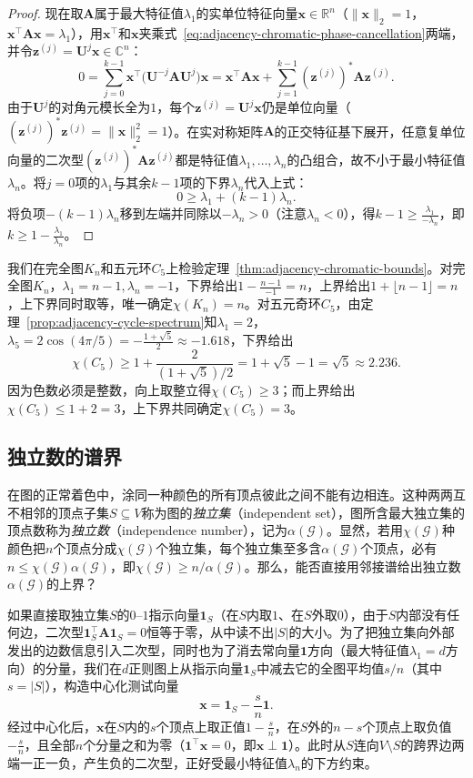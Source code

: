 \begin{proof}
现在取$\bm A$属于最大特征值$\lambda_1$的实单位特征向量$\bm x\in\mathbb R^n$（$\|\bm x\|_2=1$，$\bm x^\top\bm A\bm x=\lambda_1$），用$\bm x^\top$和$\bm x$夹乘式~\eqref{eq:adjacency-chromatic-phase-cancellation}两端，并令$\bm z^{(j)}=\bm U^j\bm x\in\mathbb C^n$：
\[
0=\sum_{j=0}^{k-1}\bm x^\top\bigl(\bm U^{-j}\bm A\bm U^j\bigr)\bm x
=\bm x^\top\bm A\bm x+\sum_{j=1}^{k-1}(\bm z^{(j)})^*\bm A\bm z^{(j)}.
\]
由于$\bm U^j$的对角元模长全为$1$，每个$\bm z^{(j)}=\bm U^j\bm x$仍是单位向量（$(\bm z^{(j)})^*\bm z^{(j)}=\|\bm x\|_2^2=1$）。在实对称矩阵$\bm A$的正交特征基下展开，任意复单位向量的二次型$(\bm z^{(j)})^*\bm A\bm z^{(j)}$都是特征值$\lambda_1,\ldots,\lambda_n$的凸组合，故不小于最小特征值$\lambda_n$。将$j=0$项的$\lambda_1$与其余$k-1$项的下界$\lambda_n$代入上式：
\[
0\geq\lambda_1+(k-1)\lambda_n.
\]
将负项$-(k-1)\lambda_n$移到左端并同除以$-\lambda_n>0$（注意$\lambda_n<0$），得$k-1\geq\frac{\lambda_1}{-\lambda_n}$，即$k\geq 1-\frac{\lambda_1}{\lambda_n}$。
\end{proof}

我们在完全图$K_n$和五元环$C_5$上检验定理~\ref{thm:adjacency-chromatic-bounds}。对完全图$K_n$，$\lambda_1=n-1,\lambda_n=-1$，下界给出$1-\frac{n-1}{-1}=n$，上界给出$1+\lfloor n-1\rfloor=n$，上下界同时取等，唯一确定$\chi(K_n)=n$。对五元奇环$C_5$，由定理~\ref{prop:adjacency-cycle-spectrum}知$\lambda_1=2$，$\lambda_5=2\cos(4\pi/5)=-\frac{1+\sqrt 5}{2}\approx -1.618$，下界给出
\[
\chi(C_5)\geq 1+\frac{2}{(1+\sqrt 5)/2}=1+\sqrt 5-1=\sqrt 5\approx 2.236.
\]
因为色数必须是整数，向上取整立得$\chi(C_5)\geq 3$；而上界给出$\chi(C_5)\leq 1+2=3$，上下界共同确定$\chi(C_5)=3$。

\subsection{独立数的谱界}
\label{sec:adjacency-hoffman-independence}

在图的正常着色中，涂同一种颜色的所有顶点彼此之间不能有边相连。这种两两互不相邻的顶点子集$S\subseteq V$称为图的\emph{独立集}（independent set），图所含最大独立集的顶点数称为\emph{独立数}（independence number），记为$\alpha(\mathcal G)$。显然，若用$\chi(\mathcal G)$种颜色把$n$个顶点分成$\chi(\mathcal G)$个独立集，每个独立集至多含$\alpha(\mathcal G)$个顶点，必有$n\leq\chi(\mathcal G)\alpha(\mathcal G)$，即$\chi(\mathcal G)\geq n/\alpha(\mathcal G)$。那么，能否直接用邻接谱给出独立数$\alpha(\mathcal G)$的上界？

如果直接取独立集$S$的$0$--$1$指示向量$\bm 1_S$（在$S$内取$1$、在$S$外取$0$），由于$S$内部没有任何边，二次型$\bm 1_S^\top\bm A\bm 1_S=0$恒等于零，从中读不出$|S|$的大小。为了把独立集向外部发出的边数信息引入二次型，同时也为了消去常向量$\bm 1$方向（最大特征值$\lambda_1=d$方向）的分量，我们在$d$正则图上从指示向量$\bm 1_S$中减去它的全图平均值$s/n$（其中$s=|S|$），构造中心化测试向量
\[
\bm x=\bm 1_S-\frac{s}{n}\bm 1.
\]
经过中心化后，$\bm x$在$S$内的$s$个顶点上取正值$1-\frac{s}{n}$，在$S$外的$n-s$个顶点上取负值$-\frac{s}{n}$，且全部$n$个分量之和为零（$\bm 1^\top\bm x=0$，即$\bm x\perp\bm 1$）。此时从$S$连向$V\setminus S$的跨界边两端一正一负，产生负的二次型，正好受最小特征值$\lambda_n$的下方约束。

